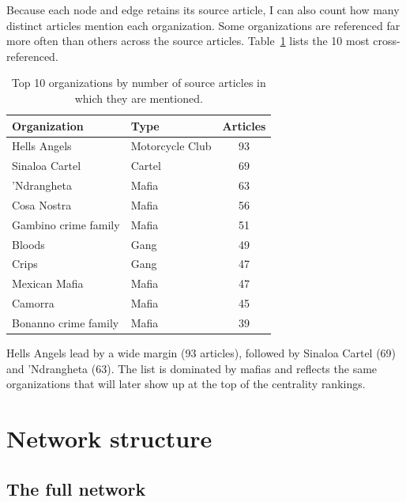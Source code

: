 \documentclass[11pt,a4paper]{article}
\begin{document}
Because each node and edge retains its source article, I can also count how many distinct articles mention each organization. Some organizations are referenced far more often than others across the source articles. Table~\ref{tab:cross_referenced} lists the 10 most cross-referenced. 

\begin{table}[H]
\centering
\caption{Top 10 organizations by number of source articles in which they are mentioned.}
\label{tab:cross_referenced}
\small
\begin{tabular}{@{}llc@{}}
\toprule
\textbf{Organization} & \textbf{Type} & \textbf{Articles} \\
\midrule
Hells Angels                  & Motorcycle Club & 93 \\
Sinaloa Cartel                & Cartel          & 69 \\
'Ndrangheta                   & Mafia           & 63 \\
Cosa Nostra                   & Mafia           & 56 \\
Gambino crime family          & Mafia           & 51 \\
Bloods                        & Gang            & 49 \\
Crips                         & Gang            & 47 \\
Mexican Mafia                 & Mafia           & 47 \\
Camorra                       & Mafia           & 45 \\
Bonanno crime family          & Mafia           & 39 \\
\bottomrule
\end{tabular}
\end{table}

Hells Angels lead by a wide margin (93 articles), followed by Sinaloa Cartel (69) and 'Ndrangheta (63). The list is dominated by mafias and reflects the same organizations that will later show up at the top of the centrality rankings. 

\section{Network structure}\label{sec:network}

\subsection{The full network}\label{sec:layers}
\end{document}

